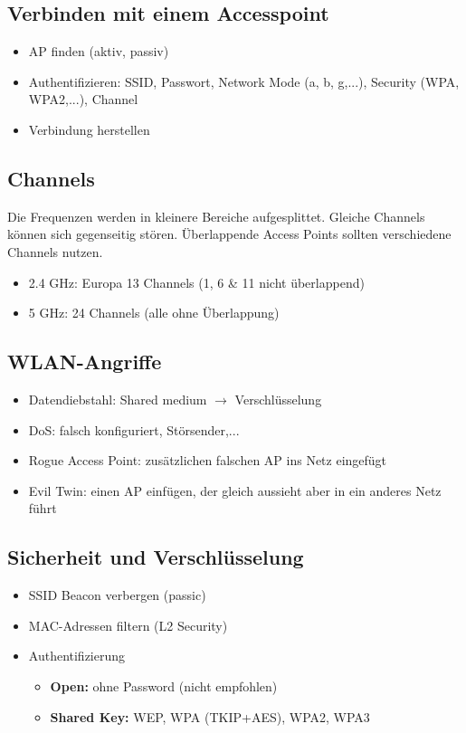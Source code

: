 \subsection*{Verbinden mit einem Accesspoint}
\begin{itemize}
	\item AP finden (aktiv, passiv)
	\item Authentifizieren: SSID, Passwort, Network Mode (a, b, g,...), Security (WPA, WPA2,...), Channel
	\item Verbindung herstellen
\end{itemize}

\subsection*{Channels}
Die Frequenzen werden in kleinere Bereiche aufgesplittet. Gleiche Channels können sich gegenseitig stören. Überlappende Access Points sollten verschiedene Channels nutzen.
\begin{itemize}
	\item 2.4 GHz: Europa 13 Channels (1, 6 \& 11 nicht überlappend)
	\item 5 GHz: 24 Channels (alle ohne Überlappung)
\end{itemize}

\subsection*{WLAN-Angriffe}
\begin{itemize}
	\item Datendiebstahl: Shared medium $\rightarrow$ Verschlüsselung
	\item DoS: falsch konfiguriert, Störsender,...
	\item Rogue Access Point: zusätzlichen falschen AP ins Netz eingefügt
	\item Evil Twin: einen AP einfügen, der gleich aussieht aber in ein anderes Netz führt
\end{itemize}

\subsection*{Sicherheit und Verschlüsselung}
\begin{itemize}
	\item SSID Beacon verbergen (passic)
	\item MAC-Adressen filtern (L2 Security)
	\item Authentifizierung
	\begin{itemize}
		\item \textbf{Open:} ohne Password (nicht empfohlen)
		\item \textbf{Shared Key:} WEP, WPA (TKIP+AES), WPA2, WPA3
	\end{itemize}
\end{itemize}


